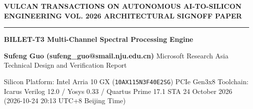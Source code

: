 \documentclass[11pt,a4paper]{article}
\begin{document}
{\scriptsize\sffamily\textcolor{vulcan}{\textbf{VULCAN TRANSACTIONS ON AUTONOMOUS AI-TO-SILICON ENGINEERING \hfill VOL. 2026 \textperiodcentered{} ARCHITECTURAL SIGNOFF PAPER}}\par}

\vspace{1pt}\textcolor{vulcan}{\rule{\textwidth}{1.2pt}}\vspace{4pt}

\begin{center}

{\sffamily\LARGE\bfseries BILLET-T3 Multi-Channel Spectral Processing Engine\par}\vspace{3pt}

{\small\sffamily\textbf{Sufeng Guo (\allowbreak{}sufeng\_\allowbreak{}guo@smail.nju.edu.cn)\allowbreak{}} \textperiodcentered{} Microsoft Research Asia \textperiodcentered{} Technical Design and Verification Report\par}\vspace{1pt}

{\scriptsize\sffamily\textcolor{black!75}{Silicon Platform: Intel Arria 10 GX (\texttt{10AX115N3F40E2SG}) PCIe Gen3x8 \textperiodcentered{} Toolchain: Icarus Verilog 12.0 / Yosys 0.33 / Quartus Prime 17.1 STA \textperiodcentered{} 24 October 2026 (\allowbreak{}2026-10-24 20:13 UTC+\allowbreak{}8 Beijing Time)\allowbreak{}}\par}

\end{center}\vspace{2pt}

\renewcommand{\abstractname}{\textcolor{vulcanblue}{Abstract}}\begin{abstract}\noindent BILLET-T3 is a synthesizable SystemVerilog spectral-processing IP block for four independently configured complex-sample channels. A shared serial engine supports 16-,\allowbreak{} 32-,\allowbreak{} 64-,\allowbreak{} 128- and 256-point FFT/\allowbreak{}IFFT,\allowbreak{} programmable stage scaling and block floating point,\allowbreak{} with rectangular,\allowbreak{} Hann or Hamming windowing and non-overlapping or 50\%-overlapping frame assembly. Independent verification passed 217 complete transform frames comprising 23,\allowbreak{}040 bins,\allowbreak{} plus 44 standalone channel-buffer frames comprising 2,\allowbreak{}624 sample transfers. Additional checks covered reset-aborted output,\allowbreak{} arithmetic units,\allowbreak{} legacy compatibility and checker fault sensitivity. Generic synthesis confirmed the required reachable hierarchy and absence of inferred latches. These results establish bounded RTL functionality and synthesizability,\allowbreak{} not physical implementation performance. [\allowbreak{}E021,\allowbreak{} E022,\allowbreak{} E023]\allowbreak{}\par{}\end{abstract}\vspace{2pt}
\end{document}
